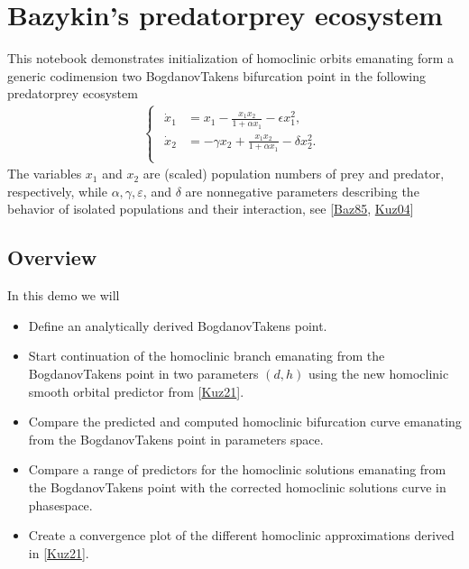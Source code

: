 \documentclass[letterpaper,10pt,english]{jupyterBook}
\begin{document}
\chapter{Bazykin’s predator\sphinxhyphen{}prey ecosystem}
\label{\detokenize{Bazykin:bazykin-s-predator-prey-ecosystem}}\label{\detokenize{Bazykin::doc}}
\sphinxAtStartPar
This notebook demonstrates initialization of homoclinic orbits emanating form a
generic codimension two Bogdanov\sphinxhyphen{}Takens bifurcation point in the following
predator\sphinxhyphen{}prey ecosystem
\begin{equation*}
\begin{split}
\begin{cases}
\begin{aligned}
\dot x_1 &= x_1 - \frac{x_1 x_2}{1+\alpha x_1} - \epsilon x_1^2, \\
\dot x_2 &= -\gamma x_2 + \frac{x_1 x_2}{1+\alpha x_1} - \delta x_2^2. \\
\end{aligned}
\end{cases}
\end{split}
\end{equation*}
\sphinxAtStartPar
The variables \(x_{1}\) and \(x_{2}\) are (scaled) population numbers of prey and
predator, respectively, while \(\alpha, \gamma, \varepsilon\), and \(\delta\) are
nonnegative parameters describing the behavior of isolated populations and
their interaction, see {[}\hyperlink{cite.references:id22}{Baz85}, \hyperlink{cite.references:id6}{Kuz04}{]}


\section{Overview}
\label{\detokenize{Bazykin:overview}}
\sphinxAtStartPar
In this demo we will
\begin{itemize}
\item {} 
\sphinxAtStartPar
Define an analytically derived Bogdanov\sphinxhyphen{}Takens point.

\item {} 
\sphinxAtStartPar
Start continuation of the homoclinic branch emanating from the
Bogdanov\sphinxhyphen{}Takens point in two parameters \((d,h)\) using the new homoclinic
smooth orbital predictor from {[}\hyperlink{cite.references:id3}{Kuz21}{]}.

\item {} 
\sphinxAtStartPar
Compare the predicted and computed homoclinic bifurcation curve emanating from the
Bogdanov\sphinxhyphen{}Takens point in parameters space.

\item {} 
\sphinxAtStartPar
Compare a range of predictors for the homoclinic solutions emanating from the
Bogdanov\sphinxhyphen{}Takens point with the corrected homoclinic solutions curve in
phase\sphinxhyphen{}space.

\item {} 
\sphinxAtStartPar
Create a convergence plot of the different homoclinic approximations
derived in {[}\hyperlink{cite.references:id3}{Kuz21}{]}.

\end{itemize}
\end{document}
